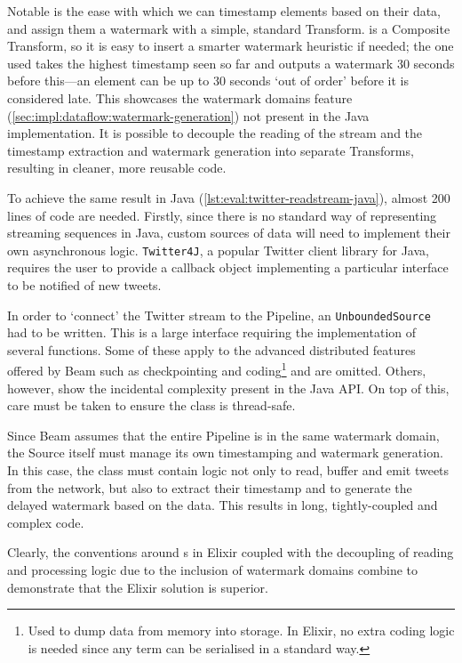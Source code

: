 Notable is the ease with which we can timestamp elements based on their data, and assign them a watermark with a simple, standard Transform.
 is a Composite Transform, so it is easy to insert a smarter watermark heuristic if needed; the one used takes the highest timestamp seen so far and outputs a watermark 30 seconds before this---an element can be up to 30 seconds `out of order' before it is considered late.
This showcases the watermark domains feature (\cref{sec:impl:dataflow:watermark-generation}) not present in the Java implementation.
It is possible to decouple the reading of the stream and the timestamp extraction and watermark generation into separate Transforms, resulting in cleaner, more reusable code.

To achieve the same result in Java (\cref{lst:eval:twitter-readstream-java}), almost 200 lines of code are needed.
Firstly, since there is no standard way of representing streaming sequences in Java, custom sources of data will need to implement their own asynchronous logic.
\texttt{Twitter4J}, a popular Twitter client library for Java, requires the user to provide a callback object implementing a particular interface to be notified of new tweets.

In order to `connect' the Twitter stream to the Pipeline, an \texttt{UnboundedSource} had to be written.
This is a large interface requiring the implementation of several functions.
Some of these apply to the advanced distributed features offered by Beam such as checkpointing and coding\footnote{
Used to dump data from memory into storage. In Elixir, no extra coding logic is needed since any term can be serialised in a standard way.
} and are omitted.
Others, however, show the incidental complexity present in the Java API.
On top of this, care must be taken to ensure the class is thread-safe.

Since Beam assumes that the entire Pipeline is in the same watermark domain, the Source itself must manage its own timestamping and watermark generation.
In this case, the class must contain logic not only to read, buffer and emit tweets from the network, but also to extract their timestamp and to generate the delayed watermark based on the data.
This results in long, tightly-coupled and complex code.

Clearly, the conventions around s in Elixir coupled with the decoupling of reading and processing logic due to the inclusion of watermark domains combine to demonstrate that the Elixir solution is superior.

